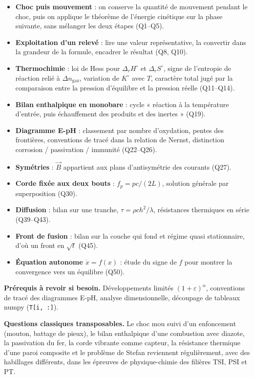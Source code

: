 \documentclass[11pt,a4paper]{article}
\providecommand{\tightlist}{\setlength{\itemsep}{0pt}\setlength{\parskip}{0pt}}
\begin{document}
\begin{itemize}
\tightlist
\item
  \textbf{Choc puis mouvement} : on conserve la quantité de mouvement pendant le choc, puis on applique le théorème de l'énergie cinétique sur la phase suivante, sans mélanger les deux étapes (Q1--Q5).
\item
  \textbf{Exploitation d'un relevé} : lire une valeur représentative, la convertir dans la grandeur de la formule, encadrer le résultat (Q8, Q10).
\item
  \textbf{Thermochimie} : loi de Hess pour \(\Delta_rH^\circ\) et \(\Delta_rS^\circ\), signe de l'entropie de réaction relié à \(\Delta n_{\text{gaz}}\), variation de \(K^\circ\) avec \(T\), caractère total jugé par la comparaison entre la pression d'équilibre et la pression réelle (Q11--Q14).
\item
  \textbf{Bilan enthalpique en monobare} : cycle « réaction à la température d'entrée, puis échauffement des produits et des inertes » (Q19).
\item
  \textbf{Diagramme E-pH} : classement par nombre d'oxydation, pentes des frontières, conventions de tracé dans la relation de Nernst, distinction corrosion / passivation / immunité (Q22--Q26).
\item
  \textbf{Symétries} : \(\vec B\) appartient aux plans d'antisymétrie des courants (Q27).
\item
  \textbf{Corde fixée aux deux bouts} : \(f_p = pc/(2L)\), solution générale par superposition (Q30).
\item
  \textbf{Diffusion} : bilan sur une tranche, \(\tau = \rho ch^2/\lambda\), résistances thermiques en série (Q39--Q43).
\item
  \textbf{Front de fusion} : bilan sur la couche qui fond et régime quasi stationnaire, d'où un front en \(\sqrt t\) (Q45).
\item
  \textbf{Équation autonome \(\dot x = f(x)\)} : étude du signe de \(f\) pour montrer la convergence vers un équilibre (Q50).
\end{itemize}

\textbf{Prérequis à revoir si besoin.} Développements limités \((1+\varepsilon)^\alpha\), conventions de tracé des diagrammes E-pH, analyse dimensionnelle, découpage de tableaux numpy (\texttt{T{[}i,\ :{]}}).

\textbf{Questions classiques transposables.} Le choc mou suivi d'un enfoncement (mouton, battage de pieux), le bilan enthalpique d'une combustion avec diazote, la passivation du fer, la corde vibrante comme capteur, la résistance thermique d'une paroi composite et le problème de Stefan reviennent régulièrement, avec des habillages différents, dans les épreuves de physique-chimie des filières TSI, PSI et PT.
\end{document}
